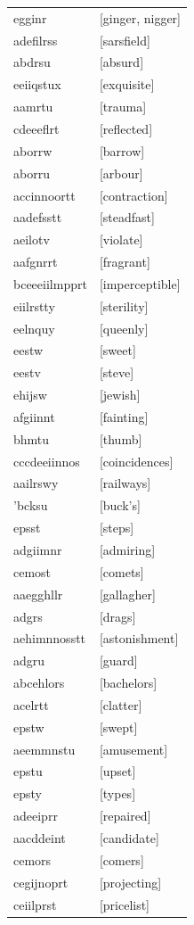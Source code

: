 \documentclass{article}
\begin{document}
\begin{tabular}{ll}
egginr & [ginger, nigger] \\
adefilrss & [sarsfield] \\
abdrsu & [absurd] \\
eeiiqstux & [exquisite] \\
aamrtu & [trauma] \\
cdeeeflrt & [reflected] \\
aborrw & [barrow] \\
aborru & [arbour] \\
accinnoortt & [contraction] \\
aadefsstt & [steadfast] \\
aeilotv & [violate] \\
aafgnrrt & [fragrant] \\
bceeeiilmpprt & [imperceptible] \\
eiilrstty & [sterility] \\
eelnquy & [queenly] \\
eestw & [sweet] \\
eestv & [steve] \\
ehijsw & [jewish] \\
afgiinnt & [fainting] \\
bhmtu & [thumb] \\
cccdeeiinnos & [coincidences] \\
aailrswy & [railways] \\
'bcksu & [buck's] \\
epsst & [steps] \\
adgiimnr & [admiring] \\
cemost & [comets] \\
aaegghllr & [gallagher] \\
adgrs & [drags] \\
aehimnnosstt & [astonishment] \\
adgru & [guard] \\
abcehlors & [bachelors] \\
acelrtt & [clatter] \\
epstw & [swept] \\
aeemmnstu & [amusement] \\
epstu & [upset] \\
epsty & [types] \\
adeeiprr & [repaired] \\
aacddeint & [candidate] \\
cemors & [comers] \\
cegijnoprt & [projecting] \\
ceiilprst & [pricelist] \\

\end{tabular}
\end{document}
